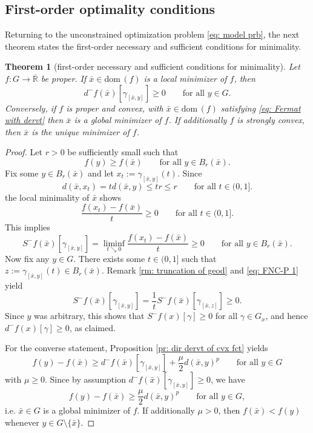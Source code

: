 \documentclass{article}
\theoremstyle{plain}\newtheorem{theorem}{Theorem}[section]
\theoremstyle{plain}\newtheorem{definition}[theorem]{Definition}
\theoremstyle{plain}\newtheorem{lemma}[theorem]{Lemma}
\theoremstyle{definition}\newtheorem{remark}[theorem]{Remark}
\theoremstyle{definition}\newtheorem{example}[theorem]{Example}
\theoremstyle{plain}\newtheorem{proposition}[theorem]{Proposition}
\theoremstyle{plain}\newtheorem{inference}[theorem]{Inference}
\theoremstyle{plain}\newtheorem{corollary}[theorem]{Corollary}
\theoremstyle{plain}\newtheorem{assumption}[theorem]{Assumption}
\begin{document}
\subsection{First-order optimality conditions}\label{s:foc}
Returning to the unconstrained optimization problem \eqref{eq: model prb}, the next theorem states the first-order necessary and sufficient conditions for minimality.
\begin{theorem}[first-order necessary and sufficient conditions for minimality]\label{th: FNC-P/FSC}
    Let $f:G\to\overline{\mathbb{R}}$ be proper. If $\bar{x}\in\mathrm{dom}\,(f)$ is a local minimizer of $f$, then
    \begin{equation}\label{eq: Fermat with dervt}
        d^-f(\bar{x})[\gamma_{[\bar{x},y]}]\geq 0 \qquad\text{for all}\,\,y\in G.
    \end{equation}
    Conversely, if $f$ is proper and convex, with $\bar{x}\in\mathrm{dom}\,(f)$ satisfying \eqref{eq: Fermat with dervt} then $\bar{x}$ is a global minimizer of $f$. If additionally $f$ is strongly convex, then $\bar{x}$ is the unique minimizer of $f$.
\end{theorem}
\begin{proof}
    Let $r>0$ be sufficiently small such that
    $$
    f(y)\geq f(\bar{x}) \qquad\text{for all}\,\,y\in B_r(\bar{x}).
    $$
    Fix some $y\in B_r(\bar{x})$ and let $x_t:=\gamma_{[\bar{x},y]}(t)$. Since
    $$
    d(\bar{x},x_t)=td(\bar{x},y)\leq tr\leq r\qquad\text{for all}\,\,t\in(0,1].
    $$
    the local minimality of $\bar{x}$ shows
    $$
    \frac{f(x_t)-f(\bar{x})}{t}\geq 0 \qquad\text{for all}\,\,t\in(0,1].
    $$
    This implies
    \begin{equation}\label{eq: FNC-P 1}
        S^-f(\bar{x})[\gamma_{[\bar{x},y]}]=\liminf_{t\searrow 0}\frac{f(x_t)-f(\bar{x})}{t}\geq 0 \qquad\text{for all}\,\,y\in B_r(\bar{x}).
    \end{equation}
    Now fix any $y\in G$. There exists some $t\in(0,1]$ such that $z:=\gamma_{[\bar{x},y]}(t)\in B_r(\bar{x})$. Remark \ref{rm: truncation of geod} and \eqref{eq: FNC-P 1} yield
    $$
    S^-f(\bar{x})[\gamma_{[\bar{x},y]}]=\frac{1}{t}S^-f(\bar{x})[\gamma_{[\bar{x},z]}]\geq 0.
    $$
    Since $y$ was arbitrary, this shows that $S^-f(x)[\gamma]\geq 0$ for all $\gamma\in G_x$,  and hence $d^-f(x)[\gamma]\geq 0$, as claimed.

    For the converse statement, Proposition \ref{pr: dir dervt of cvx fct} yields
    $$
    f(y)-f(\bar{x})\geq d^-f(\bar{x})[\gamma_{[\bar{x},y]}]+\frac{\mu}{2}d(\bar{x},y)^p \qquad\text{for all}\,\,y\in G
    $$
    with $\mu\geq 0$. Since by assumption $d^-f(\bar{x})[\gamma_{[\bar{x},y]}]\geq 0$, we have
    \begin{equation}\label{eq: p-th growth}
        f(y)-f(\bar{x})\geq \frac{\mu}{2}d(\bar{x},y)^p \qquad\text{for all}\,\,y\in G,
    \end{equation}
    i.e.  $\bar{x}\in G$ is a global minimizer of $f$. If additionally $\mu>0$, then $f(\bar{x})<f(y)$ whenever $y\in G\setminus\{\bar{x}\}$.
\end{proof}
\end{document}
